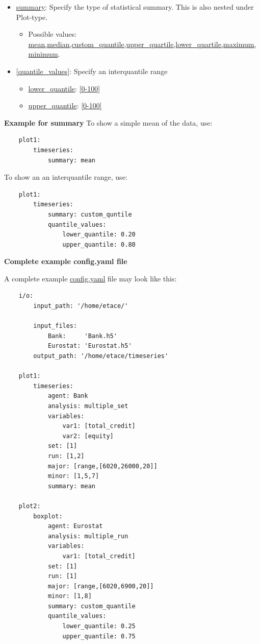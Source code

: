 \documentclass[10pt,a4paper]{article}
\begin{document}
\begin{itemize}
\item \url{summary}: Specify the type of statistical summary. This is also nested under Plot-type.
	\begin{itemize}
		\item Possible values: \url{mean,median,custom_quantile,upper_quartile,lower_quartile,maximum,minimum}.
	\end{itemize}
\item \url{[quantile_values]}: Specify an interquantile range
	\begin{itemize}
		\item \url{lower_quantile}: \url{[0-100]}
		\item \url{upper_quantile}: \url{[0-100]}
	\end{itemize}
\end{itemize}


\textbf{Example for summary}
To show a simple mean of the data, use:
\begin{lstlisting}
    plot1:
        timeseries:
            summary: mean
\end{lstlisting}

To show an an interquantile range, use:
\begin{lstlisting}
    plot1:
        timeseries:
            summary: custom_quntile
            quantile_values:
            	lower_quantile: 0.20
            	upper_quantile: 0.80
\end{lstlisting}


\bigskip
\textbf{Complete example config.yaml file}

A complete example \url{config.yaml} file may look like this:
\begin{lstlisting}
    i/o:
        input_path: '/home/etace/'
        
        input_files:         
            Bank:     'Bank.h5'
            Eurostat: 'Eurostat.h5'
        output_path: '/home/etace/timeseries'
        
    plot1:
        timeseries:
            agent: Bank
            analysis: multiple_set
            variables: 
                var1: [total_credit]  
                var2: [equity]     
            set: [1]
            run: [1,2]
            major: [range,[6020,26000,20]]
            minor: [1,5,7] 
            summary: mean
            
    plot2:
        boxplot:
            agent: Eurostat
            analysis: multiple_run
            variables: 
                var1: [total_credit]       
            set: [1]
            run: [1]
            major: [range,[6020,6900,20]]
            minor: [1,8] 
            summary: custom_quantile
            quantile_values:
            	lower_quantile: 0.25
            	upper_quantile: 0.75            
\end{lstlisting} 
\end{document}
